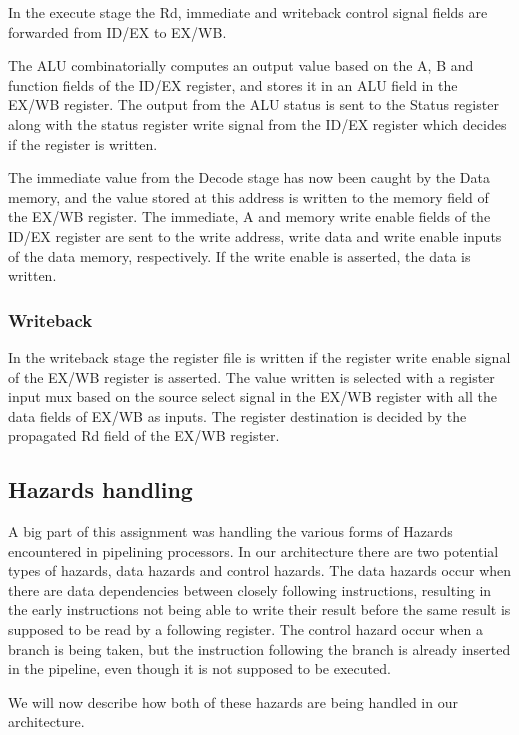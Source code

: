 \documentclass[11pt]{report}
\begin{document}
In the execute stage the Rd, immediate and writeback control signal fields are 
forwarded from ID/EX to EX/WB. 

The ALU combinatorially computes an output value based on
the A, B and function fields of the ID/EX register, and stores it in an ALU field in
the EX/WB register. The output from the ALU status is sent to the Status register along
with the status register write signal from the ID/EX register which decides if the 
register is written.

The immediate value from the Decode stage has now been caught 
by the Data memory, and the value stored at this address is written to the memory field
of the EX/WB register. The immediate, A and memory write enable fields of the ID/EX register
are sent to the write address, write data and write enable inputs of the data memory,
respectively. If the write enable is asserted, the data is written.

\subsubsection*{Writeback}

In the writeback stage the register file is written if the register write enable
signal of the EX/WB register is asserted. The value written is selected with a register
input mux based on the source select signal in the EX/WB register with all the data fields
of EX/WB as inputs. The register destination is decided by the propagated Rd field of the
EX/WB register.



\subsection*{Hazards handling}

A big part of this assignment was handling the various forms of Hazards 
encountered in pipelining processors. In our architecture there are two potential
types of hazards, data hazards and control hazards. The data hazards occur when there 
are data dependencies between closely following instructions, resulting in the
early instructions not being able to write their result before the same result is 
supposed to be read by a following register. The control hazard occur when a branch
is being taken, but the instruction following the branch is already inserted in the pipeline,
even though it is not supposed to be executed.

We will now describe how both of these hazards are being handled in our architecture.
\end{document}
